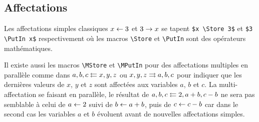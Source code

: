 \documentclass[12pt,a4paper]{article}
\begin{document}

\subsection{Affectations}

Les affectations simples classiques $x \leftarrow 3$ et $3 \rightarrow x$ se tapent \verb+$x \Store 3$+ et \verb+$3 \PutIn x$+ respectivement où les macros \verb+\Store+ et \verb+\PutIn+ sont des opérateurs mathématiques.

\medskip

Il existe aussi les macros \verb+\MStore+ et \verb+\MPutIn+ pour des affectations multiples en parallèle comme dans $a, b, c \leftleftarrows x, y, z$ ou $x, y, z \rightrightarrows a, b, c$ pour indiquer que les dernières valeurs de $x$, $y$ et $z$ sont affectées aux variables $a$, $b$ et $c$.
La multi-affectation se faisant en parallèle, le résultat de $a, b, c \leftleftarrows 2, a + b, c - b$ ne sera pas semblable à celui de $a \leftarrow 2$ suivi de $b \leftarrow a + b$, puis de $c \leftarrow c - b$ car dans le second cas les variables $a$ et $b$ évoluent avant de nouvelles affectations simples.
\end{document}
